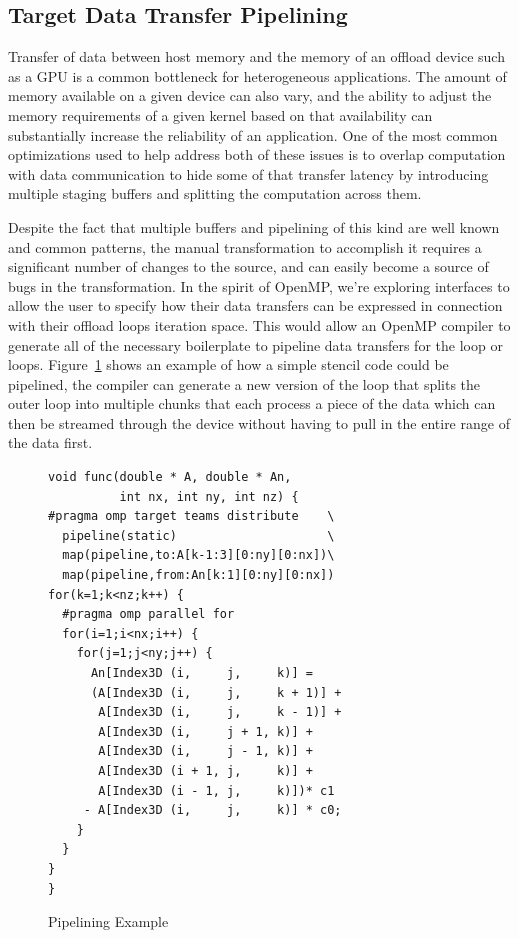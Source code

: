 \subsection{Target Data Transfer Pipelining}
\label{sub:pipelining}

Transfer of data between host memory and the memory of an offload device such as
a GPU is a common bottleneck for heterogeneous applications.  The amount of
memory available on a given device can also vary, and the ability to adjust the
memory requirements of a given kernel based on that availability can
substantially increase the reliability of an application.  One of the most
common optimizations used to help address both of these issues is to overlap
computation with data communication to hide some of that transfer latency by
introducing multiple staging buffers and splitting the computation across them.  

Despite the fact that multiple buffers and pipelining of this kind are well
known and common patterns, the manual transformation to accomplish it requires a
significant number of changes to the source, and can easily become a source of
bugs in the transformation.  In the spirit of OpenMP, we're exploring interfaces
to allow the user to specify how their data transfers can be expressed in
connection with their offload loops iteration space.  This would allow an OpenMP
compiler to generate all of the necessary boilerplate to pipeline data transfers
for the loop or loops.  Figure~\ref{fig:pipeline} shows an example of how a
simple stencil code could be pipelined, the compiler can generate a new version
of the loop that splits the outer loop into multiple chunks that each process a
piece of the data which can then be streamed through the device without having
to pull in the entire range of the data first.

\begin{figure}
\begin{verbatim}
void func(double * A, double * An,
          int nx, int ny, int nz) {
#pragma omp target teams distribute    \
  pipeline(static)                     \
  map(pipeline,to:A[k-1:3][0:ny][0:nx])\
  map(pipeline,from:An[k:1][0:ny][0:nx])
for(k=1;k<nz;k++) {
  #pragma omp parallel for
  for(i=1;i<nx;i++) {
    for(j=1;j<ny;j++) {
      An[Index3D (i,     j,     k)] =
      (A[Index3D (i,     j,     k + 1)] +
       A[Index3D (i,     j,     k - 1)] +
       A[Index3D (i,     j + 1, k)] +
       A[Index3D (i,     j - 1, k)] +
       A[Index3D (i + 1, j,     k)] +
       A[Index3D (i - 1, j,     k)])* c1
     - A[Index3D (i,     j,     k)] * c0;
    }
  } 
}
}
\end{verbatim}
\caption{Pipelining Example\label{fig:pipeline}}
\end{figure}

